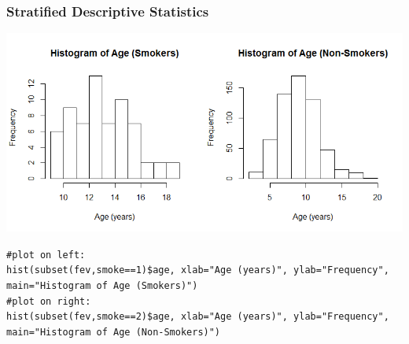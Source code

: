 \documentclass[12pt, 
hyperref={colorlinks=true, linkcolor=blue, urlcolor=cyan}]{beamer}
\begin{document}
\begin{frame}
\frametitle{Stratified Descriptive Statistics}

\vspace{-0.5cm}
\begin{center} \includegraphics[width=\textwidth]{./histogram-age-stratified} \end{center}

\vspace{-0.75cm} \begin{scriptsize} \texttt{\#plot on left: \\ hist(subset(fev,smoke==1)\$age, xlab="Age (years)", ylab="Frequency", main="Histogram of Age (Smokers)")} \\
\texttt{\#plot on right: \\ hist(subset(fev,smoke==2)\$age, xlab="Age (years)", ylab="Frequency", main="Histogram of Age (Non-Smokers)")\\} \end{scriptsize}
\end{frame}
\end{document}
